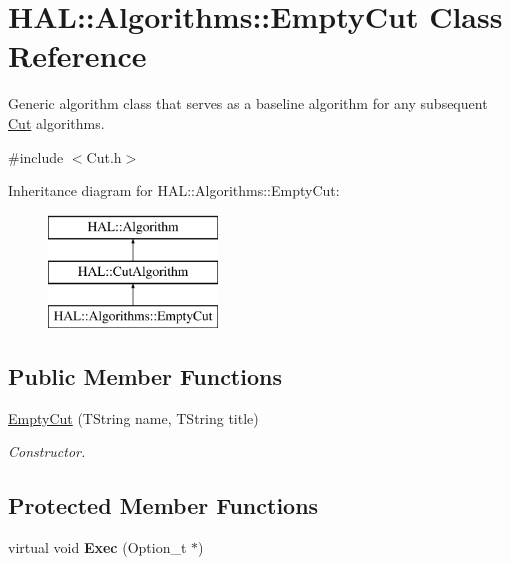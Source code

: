 \hypertarget{class_h_a_l_1_1_algorithms_1_1_empty_cut}{\section{H\+A\+L\+:\+:Algorithms\+:\+:Empty\+Cut Class Reference}
\label{class_h_a_l_1_1_algorithms_1_1_empty_cut}
}


Generic algorithm class that serves as a baseline algorithm for any subsequent \hyperlink{class_h_a_l_1_1_algorithms_1_1_cut}{Cut} algorithms.  




{\ttfamily \#include $<$Cut.\+h$>$}

Inheritance diagram for H\+A\+L\+:\+:Algorithms\+:\+:Empty\+Cut\+:\begin{figure}[H]
\begin{center}
\leavevmode
\includegraphics[height=3.000000cm]{class_h_a_l_1_1_algorithms_1_1_empty_cut}
\end{center}
\end{figure}
\subsection*{Public Member Functions}
\begin{DoxyCompactItemize}
\item 
\hyperlink{class_h_a_l_1_1_algorithms_1_1_empty_cut_a07eb3faf7e5ee7f913065cb01622cd8f}{Empty\+Cut} (T\+String name, T\+String title)
\begin{DoxyCompactList}\small\item\em Constructor. \end{DoxyCompactList}\end{DoxyCompactItemize}
\subsection*{Protected Member Functions}
\begin{DoxyCompactItemize}
\item 
\hypertarget{class_h_a_l_1_1_algorithms_1_1_empty_cut_a39235392c1b3a0f8253114dbcdf0a8a6}{virtual void {\bfseries Exec} (Option\+\_\+t $\ast$)}\label{class_h_a_l_1_1_algorithms_1_1_empty_cut_a39235392c1b3a0f8253114dbcdf0a8a6}

\end{DoxyCompactItemize}
